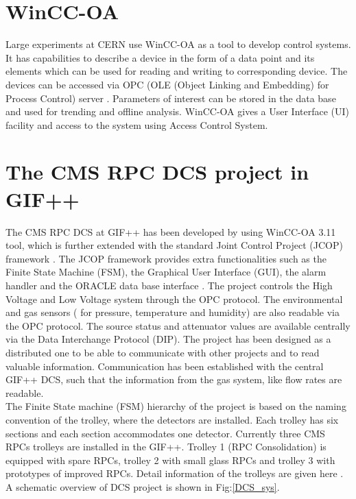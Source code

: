 \documentclass[a4paper,11pt]{article}
\begin{document}
\section{WinCC-OA}Large experiments at CERN use WinCC-OA as a tool to develop control systems. It has capabilities to describe a device in the form of a data point and its elements which can be used for reading and writing to corresponding device. The devices can be accessed via OPC (OLE (Object Linking and Embedding) for Process Control) server \cite{opc}. Parameters of interest can be stored in the data base and used for trending and offline analysis. WinCC-OA gives a User Interface (UI) facility and access to the system using Access Control System.

\section{The CMS RPC DCS project in GIF++}
The CMS RPC DCS at GIF++ has been developed by using WinCC-OA 3.11 tool, which is further extended with the standard Joint Control Project (JCOP) framework \cite{jcop}. The JCOP framework provides extra functionalities such as the Finite State Machine (FSM), the Graphical User Interface (GUI), the alarm handler and the ORACLE data base interface \cite{g-polese}. The project controls the High Voltage and Low Voltage system through the OPC protocol. The environmental and gas sensors ( for pressure, temperature and humidity) are also readable via the OPC protocol. The source status and attenuator values are available centrally via the Data Interchange Protocol (DIP). The project has been designed as a distributed one to be able to communicate with other projects and to read valuable information. Communication has been established with the central GIF++ DCS, such that the information from the gas system, like flow rates are readable.\\
The Finite State machine (FSM) hierarchy of the project is based on the naming convention of the trolley, where the detectors are installed. Each trolley has six sections and each section accommodates one detector. Currently three CMS RPCs trolleys are installed in the GIF++. Trolley 1 (RPC Consolidation) is equipped with spare RPCs, trolley 2 with small glass RPCs and trolley 3 with prototypes of improved RPCs. Detail information of the trolleys are given here \cite{salvador}. 
A schematic overview of DCS project is shown in Fig:\ref{DCS_sys}. 
\end{document}
